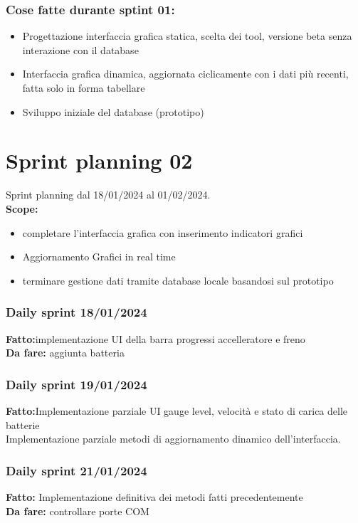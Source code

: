 \documentclass{report}
\begin{document}
\subsection*{Cose fatte durante sptint 01:}
\begin{itemize}
\item Progettazione interfaccia grafica statica, scelta dei tool, versione beta senza interazione con il database
\item Interfaccia grafica dinamica, aggiornata ciclicamente con i dati più recenti, fatta solo in forma tabellare
\item Sviluppo iniziale del database (prototipo)
\end{itemize}

\chapter{Sprint planning 02}
Sprint planning dal 18/01/2024 al 01/02/2024.\\

\textbf{Scope:}
\begin{itemize}
\item completare l'interfaccia grafica con inserimento indicatori grafici
\item Aggiornamento Grafici in real time 
\item terminare gestione dati tramite database locale basandosi sul prototipo
\end{itemize}

\subsection*{Daily sprint 18/01/2024}
\textbf{Fatto:}implementazione UI della barra progressi accelleratore e freno\\
\textbf{Da fare:} aggiunta batteria
\subsection*{Daily sprint 19/01/2024}
\textbf{Fatto:}Implementazione parziale UI gauge level, velocità e stato di carica delle batterie\\
Implementazione parziale metodi di aggiornamento dinamico dell'interfaccia.

\subsection*{Daily sprint 21/01/2024}
\textbf{Fatto:} Implementazione definitiva dei metodi fatti precedentemente\\
\textbf{Da fare:} controllare porte COM
\end{document}

